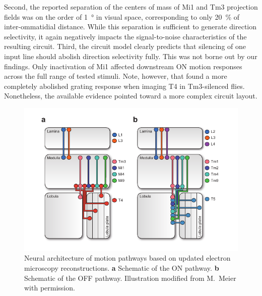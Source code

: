 Second, the reported separation of the centers of mass of Mi1 and Tm3 projection fields was on the order of \SI{1}{\degree} in visual space, corresponding to only \SI{20}{\percent} of inter-ommatidial distance. While this separation is sufficient to generate direction selectivity, it again negatively impacts the signal-to-noise characteristics of the resulting circuit. Third, the circuit model clearly predicts that silencing of one input line should abolish direction selectivity fully. This was not borne out by our findings. Only inactivation of Mi1 affected downstream ON motion responses across the full range of tested stimuli. Note, however, that \citet{Strother:2017aa} found a more completely abolished grating response when imaging T4 in Tm3-silenced flies. Nonetheless, the available evidence pointed toward a more complex circuit layout.

\begin{figure}
    \centering
    \includegraphics[width=1\textwidth]{graphics/figure_pathway}
    \caption[Map of ON and OFF pathways]
    {Neural architecture of motion pathways based on updated electron microscopy reconstructions. \textbf{a} Schematic of the ON pathway. \textbf{b} Schematic of the OFF pathway. Illustration modified from M.\ Meier with permission.}
    \label{fig:pathway}
\end{figure}

